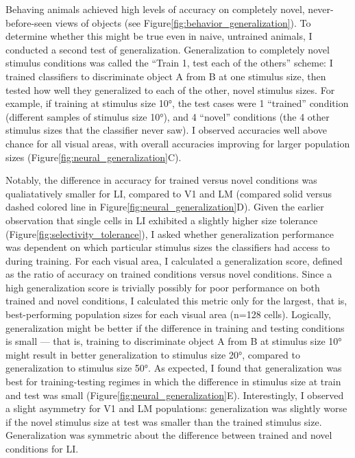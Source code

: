 Behaving animals achieved high levels of accuracy on completely novel, never-before-seen views of objects (see Figure\ref{fig:behavior_generalization}). To determine whether this might be true even in naive, untrained animals, I conducted a second test of generalization. Generalization to completely novel stimulus conditions was called the ``Train 1, test each of the others'' scheme:  I trained classifiers to discriminate object A from B at one stimulus size, then tested how well they generalized to each of the other, novel stimulus sizes. For example, if training at stimulus size \ang{10}, the test cases were 1 ``trained'' condition (different samples of stimulus size \ang{10}), and 4 ``novel'' conditions (the 4 other stimulus sizes that the classifier never saw). I observed accuracies well above chance for all visual areas, with overall accuracies improving for larger population sizes (Figure\ref{fig:neural_generalization}C). 

Notably, the difference in accuracy for trained versus novel conditions was qualiatatively smaller for LI, compared to V1 and LM (compared solid versus dashed colored line in Figure\ref{fig:neural_generalization}D). Given the earlier observation that single cells in LI exhibited a slightly higher size tolerance (Figure\ref{fig:selectivity_tolerance}), I asked whether generalization performance was dependent on which particular stimulus sizes the classifiers had access to during training. For each visual area, I calculated a generalization score, defined as the ratio of accuracy on trained conditions versus novel conditions. Since a high generalization score is trivially possibly for poor performance on both trained and novel conditions, I calculated this metric only for the largest, that is, best-performing population sizes for each visual area (n=128 cells). Logically, generalization might be better if the difference in training and testing conditions is small --- that is, training to discriminate object A from B at stimulus size \ang{10} might result in better generalization to stimulus size \ang{20}, compared to generalization to stimulus size \ang{50}. As expected, I found that generalization was best for training-testing regimes in which the difference in stimulus size at train and test was small (Figure\ref{fig:neural_generalization}E). Interestingly, I observed a slight asymmetry for V1 and LM populations: generalization was slightly worse if the novel stimulus size at test was smaller than the trained stimulus size. Generalization was symmetric about the difference between trained and novel conditions for LI.

